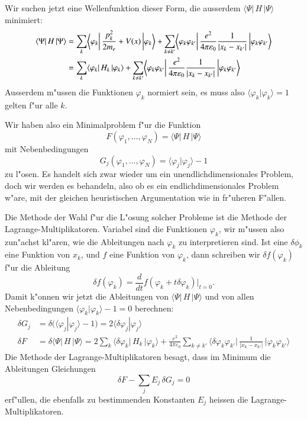 Wir suchen jetzt eine Wellenfunktion dieser Form, die ausserdem 
$\langle\Psi|\,H\,|\Psi\rangle$ minimiert:
\begin{align}
\langle\Psi|\,H\,|\Psi\rangle
&=
\sum_{k}\biggl\langle \varphi_k\biggl|\,
\frac{p_k^2}{2m_e}+V(x)
\,\biggr|\varphi_k\biggr\rangle
+
\sum_{k\ne k'}\biggl\langle \varphi_k\varphi_{k'}\biggl|\,
\frac{e^2}{4\pi\varepsilon_0}\frac{1}{|x_k-x_{k'}|}
\,\biggr|\varphi_k\varphi_{k'} \biggl\rangle
\notag
\\
&=\sum_k\langle\varphi_k|\,H_k\,|\varphi_k\rangle
+
\sum_{k\ne k'}\biggl\langle \varphi_k\varphi_{k'}\biggl|\,
\frac{e^2}{4\pi\varepsilon_0}\frac{1}{|x_k-x_{k'}|}
\,\biggr|\varphi_k\varphi_{k'} \biggl\rangle
\label{skript:hffunktional}
\end{align}
Ausserdem m"ussen die Funktionen $\varphi_k$ normiert sein, es muss
also $\langle\varphi_k|\varphi_k\rangle=1$ gelten f"ur alle $k$.

Wir haben also ein Minimalproblem f"ur die Funktion
\[
F(\varphi_1,\dots,\varphi_N)=\langle\Psi|\,H\,|\Psi\rangle
\]
mit Nebenbedingungen
\[
G_j(\varphi_1,\dots,\varphi_N)=\langle\varphi_j|\varphi_j\rangle-1
\]
zu l"osen.
Es handelt sich zwar wieder um ein unendlichdimensionales Problem,
doch wir werden es behandeln, also ob es ein endlichdimensionales Problem
w"are, mit der gleichen heuristischen Argumentation wie in fr"uheren F"allen.

Die Methode der Wahl f"ur die L"osung solcher Probleme ist die Methode
der Lagrange-Multiplikatoren. 
Variabel sind die Funktionen $\varphi_k$, wir m"ussen also zun"achst 
kl"aren, wie die Ableitungen nach $\varphi_k$ zu interpretieren sind.
Ist eine $\delta\phi_k$ eine Funktion von $x_k$, und $f$ eine Funktion von
$\varphi_k$, dann schreiben wir $\delta f(\varphi_k)$ f"ur die
Ableitung
\[
\delta f(\varphi_k)
=
\frac{d}{dt}f(\varphi_k+t\delta\varphi_k)\bigg|_{t=0}.
\]
Damit k"onnen wir jetzt die Ableitungen von $\langle\Psi|\,H\,|\Psi\rangle$
und von allen Nebenbedingungen $\langle\varphi_k|\varphi_k\rangle-1=0$
berechnen:
\begin{align}
\delta G_j
&=
\delta(\langle\varphi_j|\varphi_j\rangle-1)
=
2\langle\delta\varphi_j|\varphi_j\rangle
\label{skript:variationGj}
\\
\delta F
&=
\delta\langle\Psi|\,H\,|\Psi\rangle
=
2\sum_k\langle\delta\varphi_k|\,H_k\,|\varphi_k\rangle
+
\frac{e^2}{4\pi\varepsilon_0}\sum_{k\ne k'}
\biggl\langle\delta\varphi_k\varphi_{k'}\biggl|\,
\frac{1}{|x_k-x_{k'}|}
\,\biggr|\varphi_k\varphi_{k'} \biggr\rangle
\label{skript:variationF}
\end{align}
Die Methode der Lagrange-Multiplikatoren besagt, dass im Minimum
die Ableitungen Gleichungen
\begin{equation}
\delta F - \sum_{j} E_j\, \delta G_j =0
\label{skript:lagrangeequation}
\end{equation}
erf"ullen, die ebenfalls zu bestimmenden Konstanten $E_j$ heissen 
die Lagrange-Multiplikatoren.

